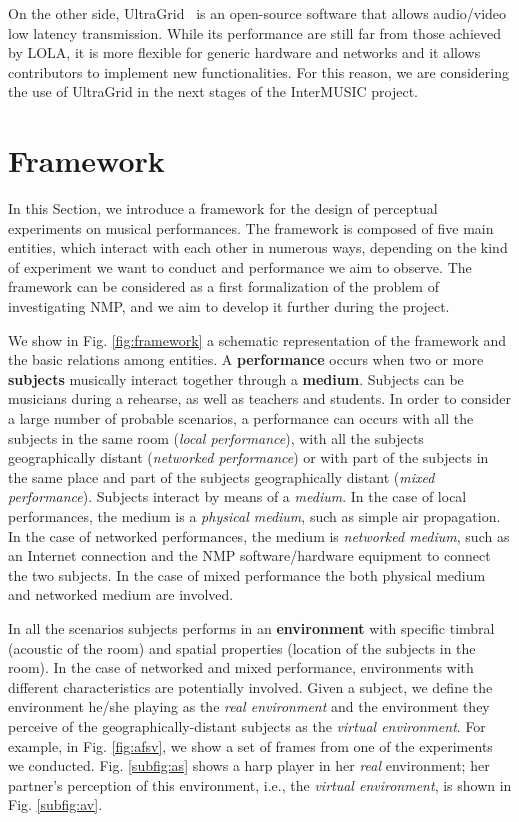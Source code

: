 \documentclass[conference]{IEEEtran}
\begin{document}
On the other side, UltraGrid~\cite{holub2006high} is an open-source software that allows audio/video low latency transmission. While its performance are still far from those achieved by LOLA, it is more flexible for generic hardware and networks and it allows contributors to implement  new functionalities. For this reason, we are considering the use of UltraGrid in the next stages of the InterMUSIC project.
\section{Framework}\label{sec:framework}
In this Section, we introduce a framework for the design of perceptual experiments on musical performances. The framework is composed of five main entities, which interact with each other in numerous ways, depending on the kind of experiment we want to conduct and performance we aim to observe. The framework can be considered as a first formalization of the problem of investigating NMP, and we aim to develop it further during the project.

We show in Fig. \ref{fig:framework} a schematic representation of the framework and the basic relations among entities. A \textbf{performance} occurs when two or more \textbf{subjects} musically interact together through a \textbf{medium}. Subjects can be musicians during a rehearse, as well as teachers and students. In order to consider a large number of probable scenarios, a performance can occurs with all the subjects in the same room (\textit{local performance}), with all the subjects geographically distant (\textit{networked performance}) or with part of the subjects in the same place and part of the subjects geographically distant (\textit{mixed performance}). Subjects interact by means of a \textit{medium}. In the case of local performances, the medium is a \textit{physical medium}, such as simple air propagation. In the case of networked performances, the medium is \textit{networked medium}, such as an Internet connection and the NMP software/hardware equipment to connect the two subjects. In the case of mixed performance the both physical medium and networked medium are involved. 

In all the scenarios subjects performs in an \textbf{environment} with specific timbral (acoustic of the room) and spatial properties (location of the subjects in the room). In the case of networked and mixed performance, environments with different characteristics are potentially involved. Given a subject, we define the environment he/she playing as the \textit{real environment} and the environment they perceive of the geographically-distant subjects as the \textit{virtual environment}. For example, in Fig. \ref{fig:afsv}, we show a set of frames from one of the experiments we conducted. Fig. \ref{subfig:as} shows a harp player in her \textit{real} environment; her partner's perception of this environment, i.e., the \textit{virtual environment}, is shown in Fig. \ref{subfig:av}. 
\end{document}
